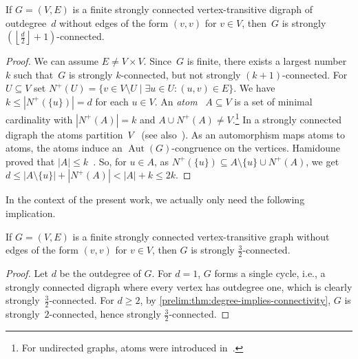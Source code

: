 \begin{theorem}
	\label{prelim:thm:degree-implies-connectivity}
	If $G = (V, E)$
	is a finite strongly connected vertex-transitive digraph of outdegree~$d$ without edges of the form $(v, v)$ for $v \in V$,
	then~$G$ is strongly
	$\left( \left\lfloor \frac{d}{2} \right\rfloor + 1 \right)$-connected.
\end{theorem} 
\begin{proof} \label{def:Nplus} 
	We can assume $E \ne V \times V$. 
	Since~$G$ is finite, there exists a largest number~$k$ 
	such that~$G$ is 
	strongly $k$-connected, but not strongly $(k+1)$-connected.
	For $U \subseteq V$
	set $N^+(U) = \{ v \in V \setminus U \mid \exists u \in U : (u,v) \in E \}$. 
	We have $k \le |N^+(\{u\})| = d$ for each $u \in V$. %
	An \emph{atom}~\cite{hamidoune77} $A \subseteq V$ is a set of minimal cardinality with
	$|N^+(A)| = k$ and
	$A \cup N^+(A) \ne V$.\footnote{For undirected graphs, atoms 
		were introduced in~\cite{Mader70,Mader71,Watkins70}.}
	In a strongly connected digraph the atoms partition~$V$~\cite{hamidoune77}
	(see also~\cite[Thm. 2.1 in both]{DBLP:journals/ejc/Hamidoune81,Hamidoune81}).
	As an automorphism maps atoms to atoms,
	the atoms induce an $\operatorname{Aut}(G)$-congruence on the vertices.
	Hamidoune proved that $|A| \le k$~\cite[Lem.~3.3]{Hamidoune81}.
	So, for $u \in A$, as $N^+(\{u\}) \subseteq A \setminus \{u\} \cup N^+(A)$, we get 
	$
	d \le |A \setminus \{u\}| + |N^+(A)| < |A| + k \le 2k.
	$ %
\end{proof} 

In the context of the present work, we actually only need the following
implication.

\begin{corollary}
	\label{prelim:prop:vertex-transitive-SCC-32-connected}
	If $G = (V, E)$
	is a finite strongly connected vertex-transitive graph without edges of the form $(v,v)$ for $v \in V$,
	then $G$ is strongly $\frac{3}{2}$-connected.
\end{corollary}
\begin{proof}
	Let $d$ be the outdegree of $G$.	
	For $d = 1$, $G$ forms a single cycle,
	i.e., a strongly connected digraph
	where every vertex has outdegree one,	
	which is clearly strongly~$\frac{3}{2}$-connected.
	For $d \ge 2$,
	by \cref{prelim:thm:degree-implies-connectivity}, 
	$G$ is strongly~$2$-connected, hence strongly $\frac{3}{2}$-connected.	
\end{proof} 

